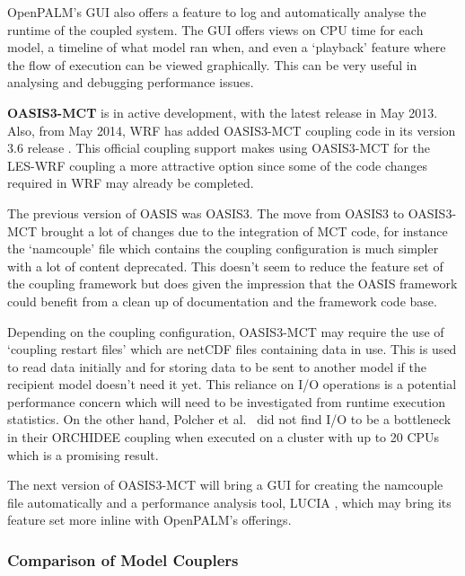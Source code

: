 OpenPALM's GUI also offers a feature to log and automatically analyse the
runtime of the coupled system. The GUI offers views on CPU time for each model,
a timeline of what model ran when, and even a `playback' feature where the flow
of execution can be viewed graphically. This can be very useful in analysing and
debugging performance issues.

\textbf{OASIS3-MCT} is in active development, with the latest release in May
2013. Also, from May 2014, WRF has added OASIS3-MCT coupling code in its version
3.6 release \cite{ENES2014}. This official coupling support makes using
OASIS3-MCT for the LES-WRF coupling a more attractive option since some of the
code changes required in WRF may already be completed.

The previous version of OASIS was OASIS3. The move from OASIS3 to OASIS3-MCT
brought a lot of changes due to the integration of MCT code, for instance the
`namcouple' file which contains the coupling configuration is much simpler with
a lot of content deprecated. This doesn't seem to reduce the feature set of the
coupling framework but does given the impression that the OASIS framework could
benefit from a clean up of documentation and the framework code base.

Depending on the coupling configuration, OASIS3-MCT may require the use of
`coupling restart files' which are netCDF \cite{Unidata} files containing data
in use. This is used to read data initially and for storing data to be sent to
another model if the recipient model doesn't need it yet. This reliance on I/O
operations is a potential performance concern which will need to be investigated
from runtime execution statistics. On the other hand, Polcher et al.\
\cite{Polcher2013} did not find I/O to be a bottleneck in their ORCHIDEE
coupling when executed on a cluster with up to 20 CPUs which is a promising
result.

The next version of OASIS3-MCT will bring a GUI for creating the namcouple file
automatically and a performance analysis tool, LUCIA \cite{Maisonnave}, which
may bring its feature set more inline with OpenPALM's offerings.

\subsubsection{Comparison of Model Couplers}

